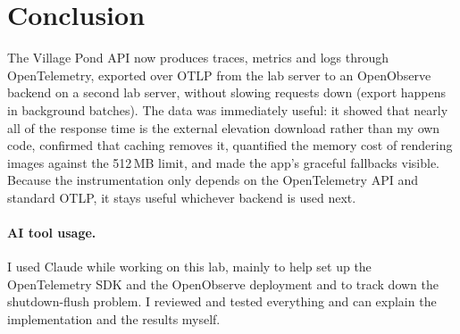 \documentclass[11pt]{article}
\begin{document}
\section{Conclusion}

The Village Pond API now produces traces, metrics and logs through OpenTelemetry,
exported over OTLP from the lab server to an OpenObserve backend on a second lab
server, without slowing requests down (export happens in background batches). The
data was immediately useful: it showed that nearly all of the response time is the
external elevation download rather than my own code, confirmed that caching removes
it, quantified the memory cost of rendering images against the 512\,MB limit, and made
the app's graceful fallbacks visible. Because the instrumentation only depends on the
OpenTelemetry API and standard OTLP, it stays useful whichever backend is used next.

\paragraph{AI tool usage.} I used Claude while working on this lab, mainly to help set
up the OpenTelemetry SDK and the OpenObserve deployment and to track down the
shutdown-flush problem. I reviewed and tested everything and can explain the
implementation and the results myself.
\end{document}
